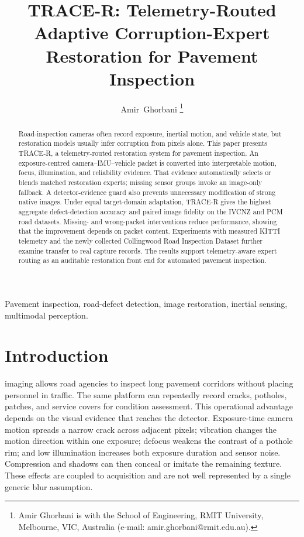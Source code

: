 \documentclass[journal]{IEEEtran}
\begin{document}
\title{TRACE-R: Telemetry-Routed Adaptive Corruption-Expert Restoration for Pavement Inspection}

\author{Amir~Ghorbani
\thanks{Amir Ghorbani is with the School of Engineering, RMIT University, Melbourne, VIC, Australia (e-mail: amir.ghorbani@rmit.edu.au).}}

\maketitle

\begin{abstract}
Road-inspection cameras often record exposure, inertial motion, and vehicle state, but restoration models usually infer corruption from pixels alone. This paper presents TRACE-R, a telemetry-routed restoration system for pavement inspection. An exposure-centred camera--IMU--vehicle packet is converted into interpretable motion, focus, illumination, and reliability evidence. That evidence automatically selects or blends matched restoration experts; missing sensor groups invoke an image-only fallback. A detector-evidence guard also prevents unnecessary modification of strong native images. Under equal target-domain adaptation, TRACE-R gives the highest aggregate defect-detection accuracy and paired image fidelity on the IVCNZ and PCM road datasets. Missing- and wrong-packet interventions reduce performance, showing that the improvement depends on packet content. Experiments with measured KITTI telemetry and the newly collected Collingwood Road Inspection Dataset further examine transfer to real capture records. The results support telemetry-aware expert routing as an auditable restoration front end for automated pavement inspection.
\end{abstract}

\begin{IEEEkeywords}
Pavement inspection, road-defect detection, image restoration, inertial sensing, multimodal perception.
\end{IEEEkeywords}

\section{Introduction}
 imaging allows road agencies to inspect long pavement corridors without placing personnel in traffic. The same platform can repeatedly record cracks, potholes, patches, and service covers for condition assessment. This operational advantage depends on the visual evidence that reaches the detector. Exposure-time camera motion spreads a narrow crack across adjacent pixels; vibration changes the motion direction within one exposure; defocus weakens the contrast of a pothole rim; and low illumination increases both exposure duration and sensor noise. Compression and shadows can then conceal or imitate the remaining texture. These effects are coupled to acquisition and are not well represented by a single generic blur assumption.
\end{document}
